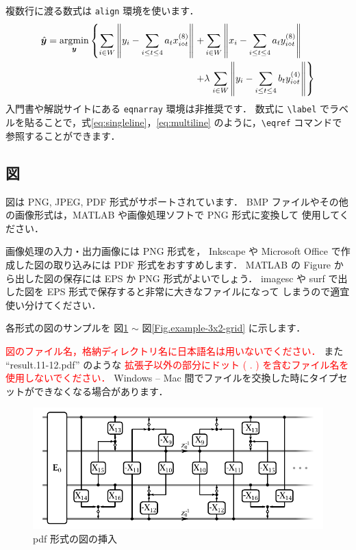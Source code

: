 \documentclass[dvipdfmx,report,disablejfam,nosetpagesize,12pt]{jsbook}
\begin{document}
複数行に渡る数式は \verb+align+ 環境を使います．
\begin{align}
   \hat{\bm{y}} = \argmin_{\bm{y}}
   \left\{
      \sum_{i\in W}
         \left\|
            y_i - \sum_{i\leq t\leq 4} a_t x_{i\diamond t}^{(8)}
         \right\|
   \right.
   + &          %
      \sum_{i\in W}
         \left\|
            x_i - \sum_{i\leq t\leq 4} a_t y_{i\diamond t}^{(8)}
         \right\|
   \nonumber \\ %
   + &
   \lambda  
   \left.
      \sum_{i\in W}
         \left\|
            y_i - \sum_{i\leq t\leq 4} b_t y_{i\diamond t}^{(4)}
         \right\|
   \right\}
   \label{eq:multiline}
\end{align}
入門書や解説サイトにある \verb+eqnarray+ 環境は非推奨です．
数式に \verb+\label+ でラベルを貼ることで，式\eqref{eq:singleline}，\eqref{eq:multiline}
のように，\verb+\eqref+ コマンドで参照することができます．

\subsection{図}
\label{Sec.basis.fig}
図は PNG, JPEG, PDF 形式がサポートされています．
BMP ファイルやその他の画像形式は，MATLAB や画像処理ソフトで PNG 形式に変換して
使用してください．


画像処理の入力・出力画像には PNG 形式を，
Inkscape や Microsoft Office で作成した図の取り込みには PDF 形式をおすすめします．
MATLAB の Figure から出した図の保存には EPS か PNG 形式がよいでしょう．
imagesc や surf で出した図を EPS 形式で保存すると非常に大きなファイルになって
しまうので適宜使い分けてください．

各形式の図のサンプルを
図\ref{Fig.example-pdf} $\sim$ 図\ref{Fig.example-3x2-grid} に示します．

\textcolor{red}{図のファイル名，格納ディレクトリ名に日本語名は用いないでください．}
また
``result.11-12.pdf'' のような
\textcolor{red}{拡張子以外の部分にドット ( . ) を含むファイル名を使用しないでください．}
Windows -- Mac 間でファイルを交換した時にタイプセットができなくなる場合があります．

\begin{figure}[tp]
   \centering
   \includegraphics[width=.7\hsize]{figure/example-pdf.pdf}
   \caption{pdf 形式の図の挿入}
   \label{Fig.example-pdf}
\end{figure}
\end{document}

